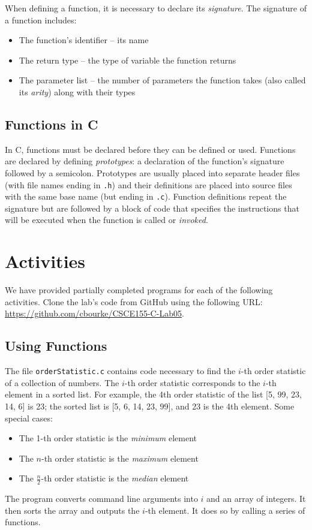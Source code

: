 \documentclass[12pt]{scrartcl}
\begin{document}
When defining a function, it is necessary to declare its \emph{signature}.  
The signature of a function includes:
\begin{itemize}
  \item The function's identifier -- its name 
  \item The return type -- the type of variable the function returns
  \item The parameter list -- the number of parameters the function takes 
	(also called its \emph{arity}) along with their types 
\end{itemize}

\subsection{Functions in C}

In C, functions must be declared before they can be defined or used.  
Functions are declared by defining \emph{prototypes}: a 
declaration of the function's signature followed by a semicolon.  
Prototypes are usually placed into separate header files (with file
names ending in \texttt{.h}) and their definitions are
placed into source files with the same base name (but ending in 
\texttt{.c}).  Function definitions repeat the signature 
but are followed by a block of code that specifies the 
instructions that will be executed when the function is called or
\emph{invoked}.

\section{Activities}

We have provided partially completed programs for each of the 
following activities.  Clone the lab's code from GitHub using the 
following URL: \url{https://github.com/cbourke/CSCE155-C-Lab05}.

\subsection{Using Functions}

The file \texttt{orderStatistic.c} contains code necessary
to find the $i$-th order statistic of a collection of numbers.   
The $i$-th order statistic corresponds to the $i$-th element in a 
sorted list.  For example, the 4th order statistic of the list 
[5, 99, 23, 14, 6] is 23; the sorted list is [5, 6, 14, 23, 99], 
and 23 is the 4th element.  Some special cases:
\begin{itemize}
  \item The 1-th order statistic is the \emph{minimum} element
  \item The $n$-th order statistic is the \emph{maximum} element
  \item The $\frac{n}{2}$-th order statistic is the \emph{median} element
\end{itemize}
The program converts command line arguments into $i$ and an
array of integers.  It then sorts the array and outputs the $i$-th 
element.  It does so by calling a series of functions.
\end{document}
